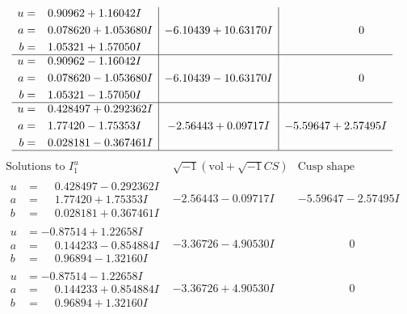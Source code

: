 \documentclass[1p]{elsarticle_modified}
\theoremstyle{definition}
\newcommand{\I}{\sqrt{-1}}
\begin{document}
$$\begin{array}{c|c|c}
\begin{aligned}
u &= \phantom{-}0.90962 + 1.16042 I \\
a &= \phantom{-}0.078620 + 1.053680 I \\
b &= \phantom{-}1.05321 + 1.57050 I\end{aligned}
 & -6.10439 + 10.63170 I & \phantom{-0.000000 } 0 \\ \hline\begin{aligned}
u &= \phantom{-}0.90962 - 1.16042 I \\
a &= \phantom{-}0.078620 - 1.053680 I \\
b &= \phantom{-}1.05321 - 1.57050 I\end{aligned}
 & -6.10439 - 10.63170 I & \phantom{-0.000000 } 0 \\ \hline\begin{aligned}
u &= \phantom{-}0.428497 + 0.292362 I \\
a &= \phantom{-}1.77420 - 1.75353 I \\
b &= \phantom{-}0.028181 - 0.367461 I\end{aligned}
 & -2.56443 + 0.09717 I & -5.59647 + 2.57495 I\\
 \hline 
 \end{array}$$\newpage$$\begin{array}{c|c|c}  
\text{Solutions to }I^u_{1}& \I (\text{vol} + \sqrt{-1}CS) & \text{Cusp shape}\\
 \hline 
\begin{aligned}
u &= \phantom{-}0.428497 - 0.292362 I \\
a &= \phantom{-}1.77420 + 1.75353 I \\
b &= \phantom{-}0.028181 + 0.367461 I\end{aligned}
 & -2.56443 - 0.09717 I & -5.59647 - 2.57495 I \\ \hline\begin{aligned}
u &= -0.87514 + 1.22658 I \\
a &= \phantom{-}0.144233 - 0.854884 I \\
b &= \phantom{-}0.96894 - 1.32160 I\end{aligned}
 & -3.36726 - 4.90530 I & \phantom{-0.000000 } 0 \\ \hline\begin{aligned}
u &= -0.87514 - 1.22658 I \\
a &= \phantom{-}0.144233 + 0.854884 I \\
b &= \phantom{-}0.96894 + 1.32160 I\end{aligned}
 & -3.36726 + 4.90530 I & \phantom{-0.000000 } 0 \\ \hline\begin{aligned}

\end{aligned}
\end{array}$$
\end{document}
